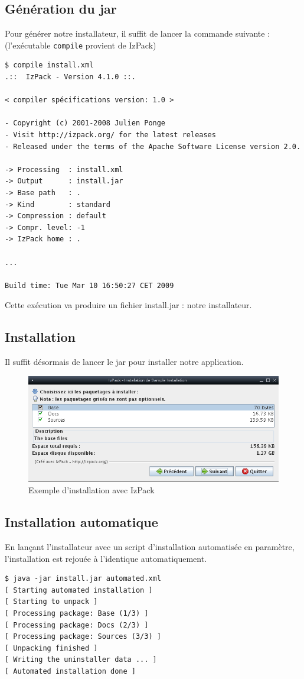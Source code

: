 \subsection{Génération du jar}
Pour générer notre installateur, il suffit de lancer la commande suivante : (l'exécutable \verb|compile| provient de IzPack)
\begin{verbatim}
$ compile install.xml
.::  IzPack - Version 4.1.0 ::.

< compiler spécifications version: 1.0 >

- Copyright (c) 2001-2008 Julien Ponge
- Visit http://izpack.org/ for the latest releases
- Released under the terms of the Apache Software License version 2.0.

-> Processing  : install.xml
-> Output      : install.jar
-> Base path   : .
-> Kind        : standard
-> Compression : default
-> Compr. level: -1
-> IzPack home : .

...

Build time: Tue Mar 10 16:50:27 CET 2009
\end{verbatim}
Cette exécution va produire un fichier install.jar : notre installateur.
\subsection{Installation}
Il suffit désormais de lancer le jar pour installer notre application.
\begin{figure}[H]
	\centering
	\includegraphics[width=15cm]{../image/installSample.png}
	\caption{Exemple d'installation avec IzPack}
\end{figure}
\subsection{Installation automatique}
En lançant l'installateur avec un script d'installation automatisée en paramètre, l'installation est rejouée à l'identique automatiquement.
\begin{verbatim}
$ java -jar install.jar automated.xml
[ Starting automated installation ]
[ Starting to unpack ]
[ Processing package: Base (1/3) ]
[ Processing package: Docs (2/3) ]
[ Processing package: Sources (3/3) ]
[ Unpacking finished ]
[ Writing the uninstaller data ... ]
[ Automated installation done ]
\end{verbatim}

